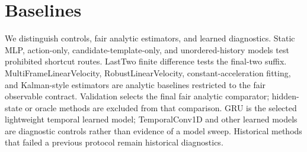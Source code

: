 \section{Baselines}
We distinguish controls, fair analytic estimators, and learned diagnostics. Static MLP, action-only, candidate-template-only, and unordered-history models test prohibited shortcut routes. LastTwo finite difference tests the final-two suffix. MultiFrameLinearVelocity, RobustLinearVelocity, constant-acceleration fitting, and Kalman-style estimators are analytic baselines restricted to the fair observable contract. Validation selects the final fair analytic comparator; hidden-state or oracle methods are excluded from that comparison. GRU is the selected lightweight temporal learned model; TemporalConv1D and other learned models are diagnostic controls rather than evidence of a model sweep. Historical methods that failed a previous protocol remain historical diagnostics.
